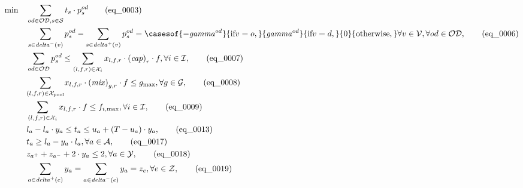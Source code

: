 \begin{align}
  \min\quad & \sum_{o d \in \mathcal{OD}, s \in \mathcal{S}} t_{s} \cdot p_{s}^{o d} \tag{eq\_0003} \\
  & \sum_{s \in \mathit{delta}^{-} \left(v\right)} p_{s}^{o d} - \sum_{s \in \mathit{delta}^{+} \left(v\right)} p_{s}^{o d} = \casesof{- \mathit{gamma}^{o d}}{\text{if} v = o ,}{\mathit{gamma}^{o d}}{\text{if} v = d ,}{0}{\text{otherwise} ,}\forall v \in \mathcal{V} , \forall o d \in \mathcal{OD} , \tag{eq\_0006} \\
  & \sum_{o d \in \mathcal{OD}} p_{s}^{o d} \leq \sum_{\left(l , f , r\right) \in \mathcal{X}_{i}} x_{l , f , r} \cdot \left(\mathit{cap}\right)_{r} \cdot f , \forall i \in \mathcal{I} , \tag{eq\_0007} \\
  & \underset{\left(l , f , r\right) \in \mathcal{X}_{\text{pool}}}{\sum} x_{l , f , r} \cdot \left(\mathit{mix}\right)_{g , r} \cdot f \leq g_{\text{max}} , \forall g \in \mathcal{G} , \tag{eq\_0008} \\
  & \sum_{\left(l , f , r\right) \in \mathcal{X}_{i}} x_{l , f , r} \cdot f \leq f_{i , \text{max}} , \forall i \in \mathcal{I} , \tag{eq\_0009} \\
  & l_{a} - l_{a} \cdot y_{a} \leq t_{a} \leq u_{a} + \left(T - u_{a}\right) \cdot y_{a} , \tag{eq\_0013} \\
  & t_{a} \geq l_{a} - y_{a} \cdot l_{a} , \forall a \in \mathcal{A} , \tag{eq\_0017} \\
  & z_{a^{+}} + z_{a^{-}} + 2 \cdot y_{a} \leq 2 , \forall a \in \mathcal{Y} , \tag{eq\_0018} \\
  & \sum_{a \in \mathit{delta}^{+} \left(e\right)} y_{a} = \sum_{a \in \mathit{delta}^{-} \left(e\right)} y_{a} = z_{e} , \forall e \in \mathcal{Z} , \tag{eq\_0019} \\
\end{align}
